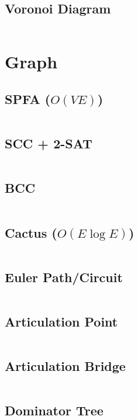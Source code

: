 \documentclass[8pt, a4paper, oneside]{extarticle}
\begin{document}
\begin{multicols*}{2}
\subsection{Voronoi Diagram}
\inputminted{c++}{codes/geometry/voronoi.cpp}

\section{Graph}
\subsection{SPFA ($O(VE)$)}
\inputminted{c++}{codes/graph/spfa.cpp}

\subsection{SCC + 2-SAT}
\inputminted{c++}{codes/graph/scc.cpp}

\subsection{BCC}
\inputminted{c++}{codes/graph/bcc.cpp}

\subsection{Cactus ($O(E \log E)$)}
\inputminted{c++}{codes/graph/cactus.cpp}

\subsection{Euler Path/Circuit}
\inputminted{c++}{codes/graph/euler.cpp}

\subsection{Articulation Point}
\inputminted{c++}{codes/graph/articulation_point.cpp}

\subsection{Articulation Bridge}
\inputminted{c++}{codes/graph/articulation_bridge.cpp}

\subsection{Dominator Tree}
\inputminted{c++}{codes/graph/dominator_tree.cpp}


\end{multicols*}
\end{document}
